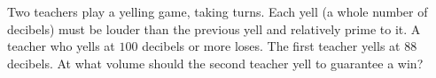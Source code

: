 Two teachers play a yelling game, taking turns. Each yell (a whole number of decibels) must be louder than the previous yell and relatively prime to it. A teacher who yells at $100$ decibels or more loses. The first teacher yells at $88$ decibels. At what volume should the second teacher yell to guarantee a win?
